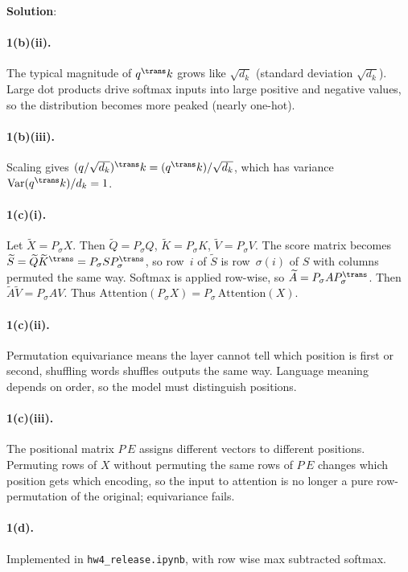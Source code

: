 \documentclass[submit]{../harvardml}
\newenvironment{solution}{
    \vspace{2mm}
    \color{blue}\noindent\textbf{Solution}:
}{}
\begin{document}
\begin{solution}
\paragraph{1(b)(ii).}
The typical magnitude of $q^\trans k$ grows like $\sqrt{d_k}$ (standard deviation $\sqrt{d_k}$). Large dot products drive softmax inputs into large positive and negative values, so the distribution becomes more peaked (nearly one-hot).

\paragraph{1(b)(iii).}
Scaling gives $(q/\sqrt{d_k})^\trans k = (q^\trans k)/\sqrt{d_k}$, which has variance $\mathrm{Var}(q^\trans k)/d_k = 1$.

\paragraph{1(c)(i).}
Let $\widetilde{X} = P_\sigma X$. Then $\widetilde{Q} = P_\sigma Q$, $\widetilde{K} = P_\sigma K$, $\widetilde{V} = P_\sigma V$. The score matrix becomes $\widetilde{S} = \widetilde{Q}\widetilde{K}^\trans = P_\sigma S P_\sigma^\trans$, so row~$i$ of $\widetilde{S}$ is row~$\sigma(i)$ of $S$ with columns permuted the same way. Softmax is applied row-wise, so $\widetilde{A} = P_\sigma A P_\sigma^\trans$. Then $\widetilde{A}\widetilde{V} = P_\sigma A V$. Thus $\mathrm{Attention}(P_\sigma X) = P_\sigma\,\mathrm{Attention}(X)$.

\paragraph{1(c)(ii).}
Permutation equivariance means the layer cannot tell which position is first or second, shuffling words shuffles outputs the same way. Language meaning depends on order, so the model must distinguish positions.

\paragraph{1(c)(iii).}
The positional matrix $P\,E$ assigns different vectors to different positions. Permuting rows of $X$ without permuting the same rows of $P\,E$ changes which position gets which encoding, so the input to attention is no longer a pure row-permutation of the original; equivariance fails.

\paragraph{1(d).}
Implemented in \texttt{hw4\_release.ipynb}, with row wise max subtracted softmax.


\end{solution}
\end{document}
